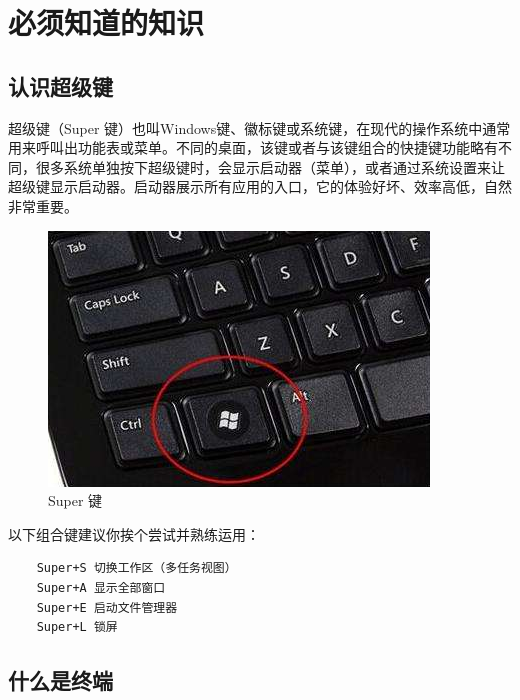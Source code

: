 
\ifx\all\undefined



\fi


\setcounter{chapter}{0}

\chapter{必须知道的知识}


\section{认识超级键}

\par 超级键（Super 键）也叫Windows键、徽标键或系统键，在现代的操作系统中通常用来呼叫出功能表或菜单。不同的桌面，该键或者与该键组合的快捷键功能略有不同，很多系统单独按下超级键时，会显示启动器（菜单），或者通过系统设置来让超级键显示启动器。启动器展示所有应用的入口，它的体验好坏、效率高低，自然非常重要。

\begin{figure} [htbp]
	\centering
	\includegraphics [scale=0.6] {images/ch01/2021-10-28_15-33-03.png}
	\caption{Super 键}
\end{figure}

\par 以下组合键建议你挨个尝试并熟练运用：
\begin{lstlisting}
    Super+S 切换工作区（多任务视图）
    Super+A 显示全部窗口
    Super+E 启动文件管理器
    Super+L 锁屏
\end{lstlisting}


\section{什么是终端}

